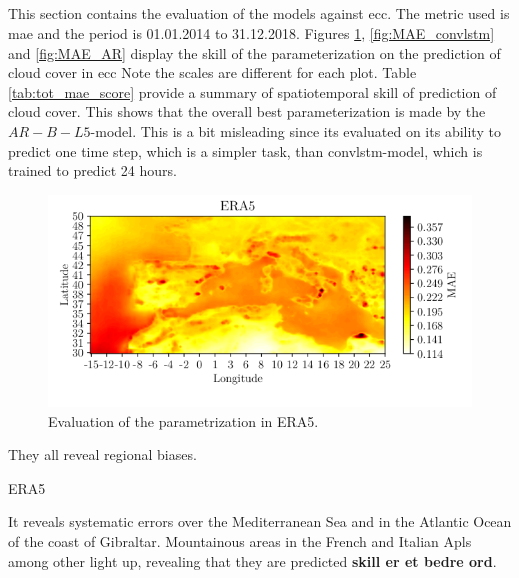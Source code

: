 \subsection{}
This section contains the evaluation of the models against \acrshort{ecc}. The metric used is \acrshort{mae} and the period is 01.01.2014 to 31.12.2018. Figures \ref{fig:MAE_era}, \ref{fig:MAE_convlstm} and \ref{fig:MAE_AR} display the skill of the parameterization on the prediction of cloud cover in \acrshort{ecc}
Note the scales are different for each plot. Table \ref{tab:tot_mae_score} provide a summary of spatiotemporal skill of prediction of cloud cover. This shows that the overall best parameterization is made by the $AR-B-L5$-model. This is a bit misleading since its evaluated on its ability to predict one time step, which is a simpler task, than \acrshort{convlstm}-model, which is trained to predict 24 hours. 


\begin{figure}
    \centering
    \includegraphics{python_figs/mae_era_vs_target_test_period_2014_to_2018.png}
    \caption{Evaluation of the parametrization in ERA5.}
    \label{fig:MAE_era}
\end{figure}

They all reveal regional biases. 

ERA5 


It reveals systematic errors over the Mediterranean Sea and in the Atlantic Ocean of the coast of Gibraltar. Mountainous areas in the French and Italian Apls among other light up, revealing that they are predicted \textbf{skill er et bedre ord}. 


